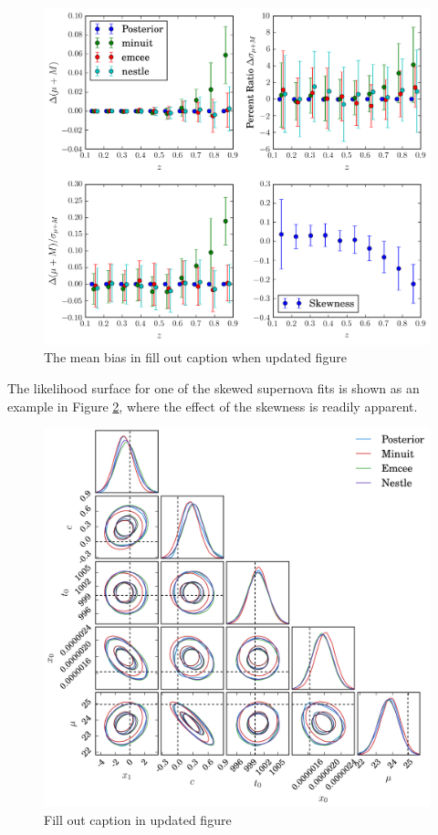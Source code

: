 \documentclass[a4paper,fleqn,usenatbib]{mnras}
\newcommand{\red}{\color{red}}
\begin{document}
\begin{figure}
	\includegraphics[width=\textwidth]{../output/bias_dessky.png}
    \caption{The mean bias in {\red fill out caption when updated figure}}
    \label{fig:bias_des}
\end{figure}
The likelihood surface for one of the skewed supernova fits is shown as an example in Figure \ref{fig:example}, where the effect of the skewness is readily apparent.
\begin{figure}
	\includegraphics[width=\textwidth]{../output/bias_surface.png}
	\caption{{\red Fill out caption in updated figure}}
	\label{fig:example}
\end{figure}
\end{document}
